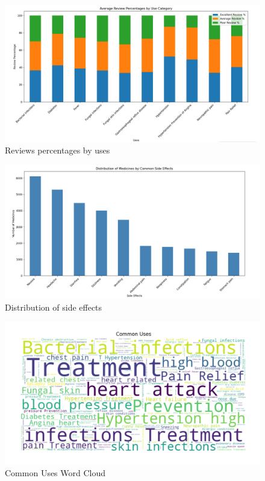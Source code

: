 \documentclass[sigconf]{acmart}
\begin{document}
\begin{figure}[H]
	\centering
	\includegraphics[width=\linewidth]{graphic3.png}
	\caption{Reviews percentages by uses}
	\label{fig:uml}
  \end{figure}

\begin{figure}[H]
	\centering
	\includegraphics[width=\linewidth]{graphic4.png}
	\caption{Distribution of side effects}
	\label{fig:uml}
  \end{figure}

\begin{figure}[H]
	\centering
	\includegraphics[width=\linewidth]{graphic5.png}
	\caption{Common Uses Word Cloud}
	\label{fig:uml}
  \end{figure} 
\end{document}
